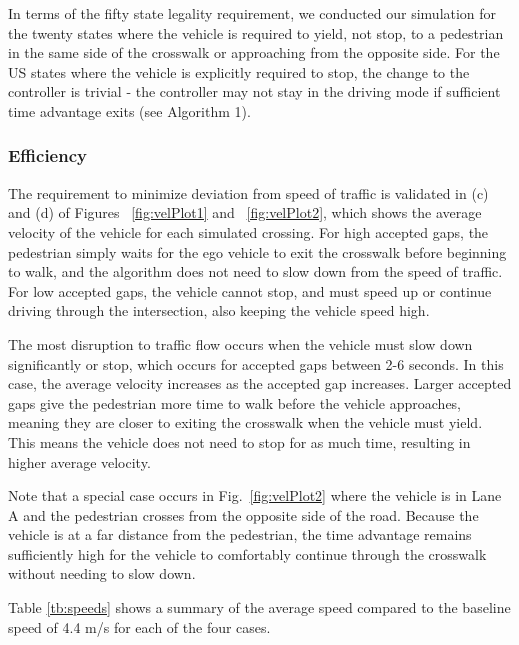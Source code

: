 \documentclass[letterpaper, 10 pt, conference]{ieeeconf}  %
\begin{document}
In terms of the fifty state legality requirement, we conducted our simulation for the twenty states where the vehicle is required to yield, not stop, to a pedestrian in the same side of the crosswalk or approaching from the opposite side. For the US states where the vehicle is explicitly required to stop, the change to the controller is trivial - the controller may not stay in the driving mode if sufficient time advantage exits (see Algorithm 1). 

\subsubsection{Efficiency}

The requirement to minimize deviation from speed of traffic is validated in (c) and (d) of Figures ~\ref{fig:velPlot1} and ~\ref{fig:velPlot2}, which shows the average velocity of the vehicle for each simulated crossing. For high accepted gaps, the pedestrian simply waits for the ego vehicle to exit the crosswalk before beginning to walk, and the algorithm does not need to slow down from the speed of traffic. For low accepted gaps, the vehicle cannot stop, and must speed up or continue driving through the intersection, also keeping the vehicle speed high.  

The most disruption to traffic flow occurs when the vehicle must slow down significantly or stop, which occurs for accepted gaps between 2-6 seconds. In this case, the average velocity increases as the accepted gap increases. Larger accepted gaps give the pedestrian more time to walk before the vehicle approaches, meaning they are closer to exiting the crosswalk when the vehicle must yield. This means the vehicle does not need to stop for as much time, resulting in higher average velocity. 

Note that a special case occurs in Fig.~\ref{fig:velPlot2} where the vehicle is in Lane A and the pedestrian crosses from the opposite side of the road. Because the vehicle is at a far distance from the pedestrian, the time advantage remains sufficiently high for the vehicle to comfortably continue through the crosswalk without needing to slow down. 

Table \ref{tb:speeds} shows a summary of the average speed compared to the baseline speed of 4.4 m/s for each of the four cases.
\end{document}
